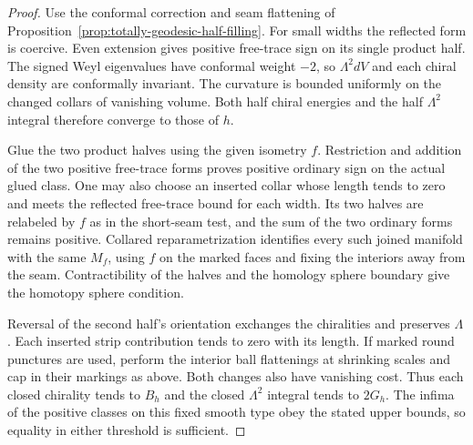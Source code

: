 \begin{proof}
Use the conformal correction and seam flattening of
Proposition~\ref{prop:totally-geodesic-half-filling}.
For small widths the reflected form is coercive. Even
extension gives positive free-trace sign on its single
product half. The signed Weyl eigenvalues
have conformal weight \(-2\), so \(\Lambda^2dV\) and
each chiral density are conformally invariant. The curvature
is bounded uniformly on the changed collars of vanishing
volume. Both half chiral energies and the half \(\Lambda^2\)
integral therefore converge to those of \(h\).

Glue the two product halves using the given isometry
\(f\). Restriction and addition of the two positive
free-trace forms proves positive ordinary sign on the
actual glued class. One may also choose an inserted collar
whose length tends to zero and meets the reflected
free-trace bound for each width. Its two halves are
relabeled by \(f\) as in the short-seam test, and the
sum of the two ordinary forms remains positive.
Collared reparametrization identifies every such joined
manifold with the same \(M_f\), using \(f\) on the
marked faces and fixing the interiors away from the seam.
Contractibility of the halves and the homology sphere
boundary give the homotopy sphere condition.

Reversal of the second half's orientation exchanges the
chiralities and preserves \(\Lambda\). Each inserted
strip contribution tends to zero with its length.
If marked round punctures are used, perform the interior
ball flattenings at shrinking scales and cap in their
markings as above. Both changes also have vanishing cost.
Thus each closed chirality tends to \(B_h\) and the
closed \(\Lambda^2\) integral tends to \(2G_h\).
The infima of the positive classes on this fixed smooth
type obey the stated upper bounds, so equality in either
threshold is sufficient.
\end{proof}

